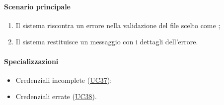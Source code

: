 \paragraph*{Scenario principale}
\begin{enumerate}
  \item Il sistema riscontra un errore nella validazione del file scelto come ;
  \item Il sistema restituisce un messaggio con i dettagli dell'errore. 
\end{enumerate}

\paragraph*{Specializzazioni}
\begin{itemize}
  \item Credenziali incomplete (\hyperref[UC37]{UC37});
  \item Credenziali errate (\hyperref[UC38]{UC38}).
\end{itemize}